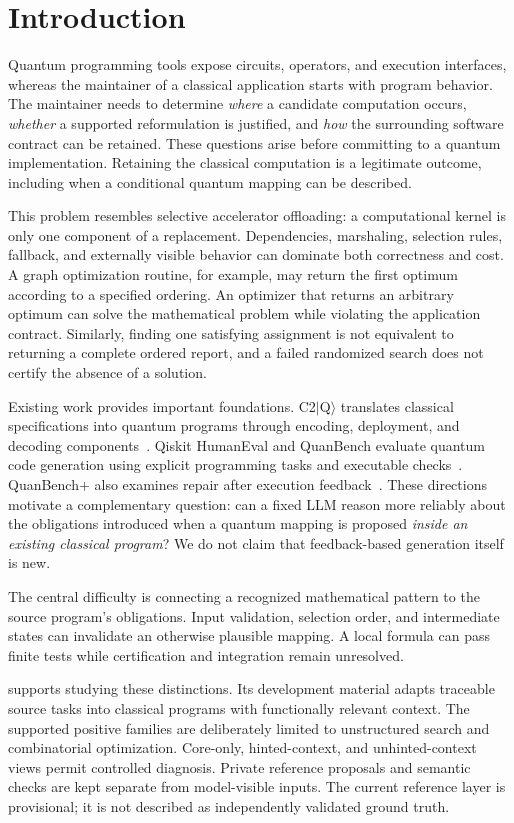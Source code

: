 \section{Introduction}
Quantum programming tools expose circuits, operators, and execution interfaces,
whereas the maintainer of a classical application starts with program behavior.
The maintainer needs to determine \emph{where} a candidate computation occurs,
\emph{whether} a supported reformulation is justified, and \emph{how} the
surrounding software contract can be retained. These questions arise before
committing to a quantum implementation. Retaining the classical computation is
a legitimate outcome, including when a conditional quantum mapping can be described.

This problem resembles selective accelerator offloading: a computational kernel
is only one component of a replacement. Dependencies, marshaling, selection rules,
fallback, and externally visible behavior can dominate both correctness and cost.
A graph optimization routine, for example, may return the first optimum according
to a specified ordering. An optimizer that returns an arbitrary optimum can solve
the mathematical problem while violating the application contract. Similarly,
finding one satisfying assignment is not equivalent to returning a complete ordered
report, and a failed randomized search does not certify the absence of a solution.

Existing work provides important foundations. C2$|$Q$\rangle$ translates classical
specifications into quantum programs through encoding, deployment, and decoding
components~\cite{c2q}. Qiskit HumanEval and QuanBench evaluate quantum code
generation using explicit programming tasks and executable
checks~\cite{qhe,quanbench}. QuanBench+ also examines repair after execution
feedback~\cite{quanplus}. These directions motivate a complementary question:
can a fixed LLM reason more reliably about the obligations introduced when a
quantum mapping is proposed \emph{inside an existing classical program}?
We do not claim that feedback-based generation itself is new.

The central difficulty is connecting a recognized mathematical pattern to the
source program's obligations. Input validation, selection order, and intermediate
states can invalidate an otherwise plausible mapping. A local formula can pass
finite tests while certification and integration remain unresolved.

\bench{} supports studying these distinctions. Its development material adapts
traceable source tasks into classical programs with functionally relevant context.
The supported positive families are deliberately limited to unstructured search
and combinatorial optimization. Core-only, hinted-context, and unhinted-context
views permit controlled diagnosis. Private reference proposals and semantic
checks are kept separate from model-visible inputs. The current reference layer
is provisional; it is not described as independently validated ground truth.


